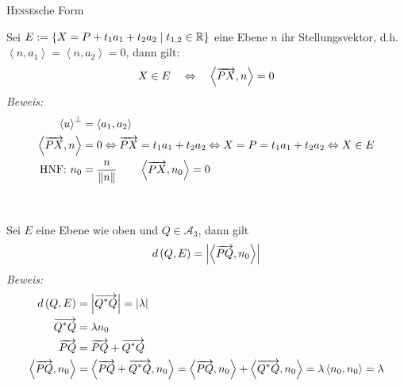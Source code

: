 \begin{mylemma}\textsc{Hesse}sche Form\medskip

    Sei $E:= \left\{ X = P + t_1 a_1 + t_2 a_2 \mid t_{1,2} \in \mathbb{R} \right\}$ eine Ebene $n$ ihr Stellungsvektor, d.h. $\left\langle n, a_1 \right\rangle = \left\langle n, a_2 \right\rangle = 0$, dann gilt:
    \begin{align*}
        X \in E \quad \Leftrightarrow \quad \left\langle \overrightarrow{PX}, n \right\rangle = 0
    \end{align*}
    \textit{Beweis:}
    \begin{align*}
        \left\langle u \right\rangle^{\bot} & = \left\langle a_1, a_2 \right\rangle\\
        \left\langle \overrightarrow{PX}, n \right\rangle & = 0 \Leftrightarrow \overrightarrow{PX} = t_1 a_1 + t_2 a_2 \Leftrightarrow X = P = t_1 a_1 + t_2 a_2 \Leftrightarrow X \in E\\
        \text{HNF: } n_0 & = \frac{n}{\| n \|} \qquad \left\langle \overrightarrow{PX}, n_0 \right\rangle = 0
    \end{align*}
\end{mylemma}

\begin{mylemma}\ \medskip

    Sei $E$ eine Ebene wie oben und $Q \in \mathcal{A}_3$, dann gilt
    \begin{align*}
        d\left( Q, E \right) = \left| \left\langle \overrightarrow{PQ}, n_0 \right\rangle \right|
    \end{align*}
    \textit{Beweis:}
    \begin{align*}
        d\left( Q, E \right) & = \left| \overrightarrow{Q^{*}Q} \right| = \left| \lambda \right|\\
        \overrightarrow{Q^{*}Q} & = \lambda n_0\\
        \overrightarrow{PQ} & = \overrightarrow{PQ} + \overrightarrow{Q^{*}Q}\\
        \left\langle \overrightarrow{PQ}, n_0 \right\rangle & = \left\langle \overrightarrow{PQ} + \overrightarrow{Q^{*}Q}, n_0 \right\rangle = \left\langle \overrightarrow{PQ}, n_0 \right\rangle + \left\langle \overrightarrow{Q^{*}Q}, n_0 \right\rangle = \lambda \left\langle n_0, n_0 \right\rangle = \lambda
    \end{align*}
\end{mylemma}

